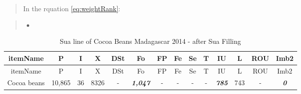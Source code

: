 \documentclass[]{article}
\begin{document}
\begin{quote}
In the rquation \ref{eq:weightRank}:
\end{quote}

\begin{quote}
\begin{itemize}
\item
\end{itemize}
\end{quote}

\begin{longtable}[]{@{}cccccccccccccc@{}}
\caption{Sua line of Cocoa Beans Madagascar 2014 - after Sua
Filling}\tabularnewline
\toprule
itemName & P & I & X & DSt & Fo & FP & Fe & Se & T & IU & L & ROU &
Imb2\tabularnewline
\midrule
\endfirsthead
\toprule
itemName & P & I & X & DSt & Fo & FP & Fe & Se & T & IU & L & ROU &
Imb2\tabularnewline
\midrule
\endhead
Cocoa beans & 10,865 & 36 & 8326 & - & \textbf{\emph{1,047}} & - & - & -
& - & \textbf{\emph{785}} & 743 & - & \textbf{\emph{0}}\tabularnewline
\bottomrule
\end{longtable}
\end{document}
